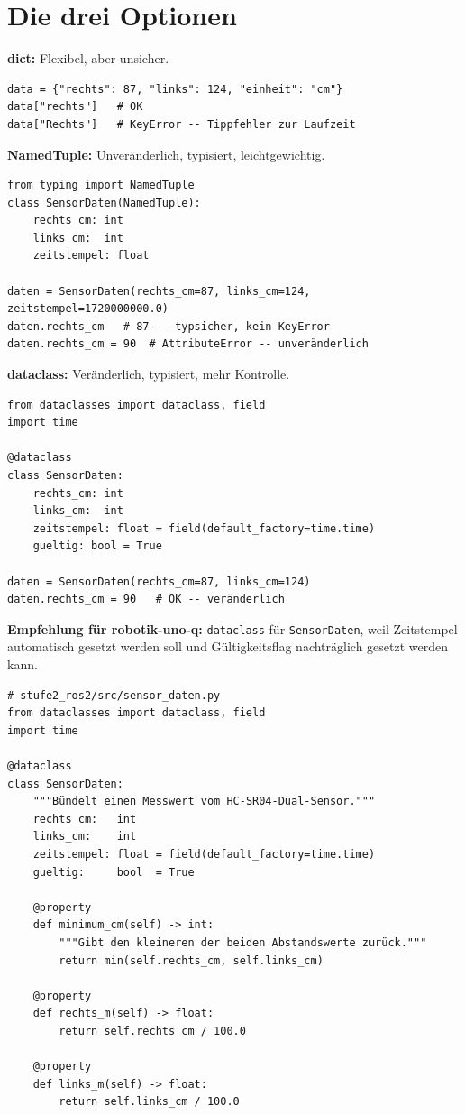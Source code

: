 \section{Die drei Optionen}

\begin{wissenBox}
\textbf{dict:} Flexibel, aber unsicher.
\begin{lstlisting}
data = {"rechts": 87, "links": 124, "einheit": "cm"}
data["rechts"]   # OK
data["Rechts"]   # KeyError -- Tippfehler zur Laufzeit
\end{lstlisting}

\textbf{NamedTuple:} Unveränderlich, typisiert, leichtgewichtig.
\begin{lstlisting}
from typing import NamedTuple
class SensorDaten(NamedTuple):
    rechts_cm: int
    links_cm:  int
    zeitstempel: float

daten = SensorDaten(rechts_cm=87, links_cm=124, zeitstempel=1720000000.0)
daten.rechts_cm   # 87 -- typsicher, kein KeyError
daten.rechts_cm = 90  # AttributeError -- unveränderlich
\end{lstlisting}

\textbf{dataclass:} Veränderlich, typisiert, mehr Kontrolle.
\begin{lstlisting}
from dataclasses import dataclass, field
import time

@dataclass
class SensorDaten:
    rechts_cm: int
    links_cm:  int
    zeitstempel: float = field(default_factory=time.time)
    gueltig: bool = True

daten = SensorDaten(rechts_cm=87, links_cm=124)
daten.rechts_cm = 90   # OK -- veränderlich
\end{lstlisting}
\end{wissenBox}

\textbf{Empfehlung für robotik-uno-q:}
\texttt{dataclass} für \texttt{SensorDaten},
weil Zeitstempel automatisch gesetzt werden soll
und Gültigkeitsflag nachträglich gesetzt werden kann.

\begin{lstlisting}
# stufe2_ros2/src/sensor_daten.py
from dataclasses import dataclass, field
import time

@dataclass
class SensorDaten:
    """Bündelt einen Messwert vom HC-SR04-Dual-Sensor."""
    rechts_cm:   int
    links_cm:    int
    zeitstempel: float = field(default_factory=time.time)
    gueltig:     bool  = True

    @property
    def minimum_cm(self) -> int:
        """Gibt den kleineren der beiden Abstandswerte zurück."""
        return min(self.rechts_cm, self.links_cm)

    @property
    def rechts_m(self) -> float:
        return self.rechts_cm / 100.0

    @property
    def links_m(self) -> float:
        return self.links_cm / 100.0
\end{lstlisting}

